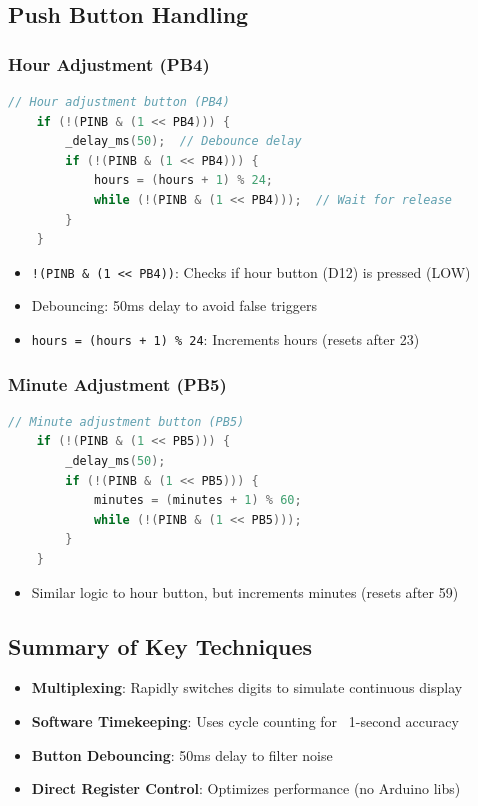 \documentclass{article}
\begin{document}
\subsection{Push Button Handling}
\subsubsection{Hour Adjustment (PB4)}
\begin{lstlisting}[language=C]
    // Hour adjustment button (PB4)
    if (!(PINB & (1 << PB4))) {
        _delay_ms(50);  // Debounce delay
        if (!(PINB & (1 << PB4))) {
            hours = (hours + 1) % 24;
            while (!(PINB & (1 << PB4)));  // Wait for release
        }
    }
\end{lstlisting}

\begin{itemize}
\item \texttt{!(PINB \& (1 << PB4))}: Checks if hour button (D12) is pressed (LOW)
\item Debouncing: 50ms delay to avoid false triggers
\item \texttt{hours = (hours + 1) \% 24}: Increments hours (resets after 23)
\end{itemize}

\subsubsection{Minute Adjustment (PB5)}
\begin{lstlisting}[language=C]
    // Minute adjustment button (PB5)
    if (!(PINB & (1 << PB5))) {
        _delay_ms(50);
        if (!(PINB & (1 << PB5))) {
            minutes = (minutes + 1) % 60;
            while (!(PINB & (1 << PB5)));
        }
    }
\end{lstlisting}

\begin{itemize}
\item Similar logic to hour button, but increments minutes (resets after 59)
\end{itemize}

\subsection{Summary of Key Techniques}
\begin{itemize}
\item \textbf{Multiplexing}: Rapidly switches digits to simulate continuous display
\item \textbf{Software Timekeeping}: Uses cycle counting for ~1-second accuracy
\item \textbf{Button Debouncing}: 50ms delay to filter noise
\item \textbf{Direct Register Control}: Optimizes performance (no Arduino libs)
\end{itemize}
\end{document}

